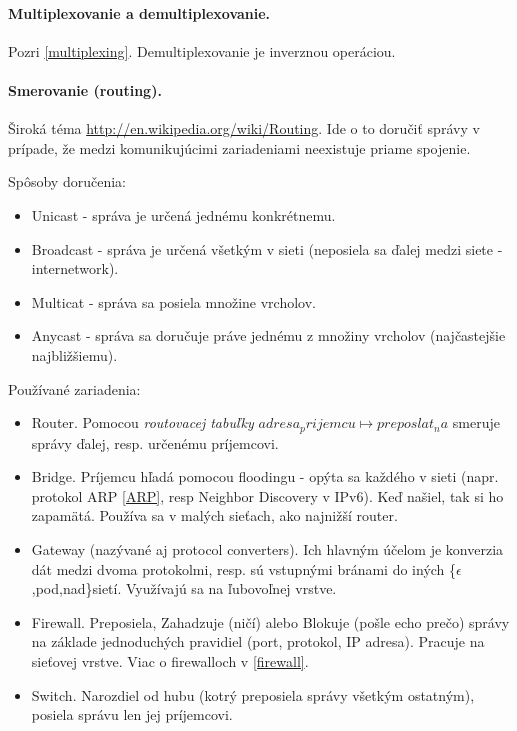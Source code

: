 \paragraph{Multiplexovanie a demultiplexovanie.}  
Pozri \ref{multiplexing}. Demultiplexovanie je inverznou operáciou. 

\paragraph{Smerovanie (routing).}     
Široká téma \url{http://en.wikipedia.org/wiki/Routing}. 
Ide o to doručiť správy v prípade, že medzi komunikujúcimi zariadeniami neexistuje priame spojenie. 

Spôsoby doručenia:
\begin{itemize}
\item Unicast - správa je určená jednému konkrétnemu.         
\item Broadcast - správa je určená všetkým v sieti (neposiela sa ďalej medzi siete - internetwork).
\item Multicat - správa sa posiela množine vrcholov. 
\item Anycast - správa sa doručuje práve jednému z množiny vrcholov (najčastejšie najbližšiemu).
\end{itemize}                               
                
Používané zariadenia:
\begin{itemize}
\item Router. Pomocou \emph{routovacej tabuľky} $adresa_prijemcu \mapsto preposlat_na$ smeruje správy ďalej, resp. určenému príjemcovi.         
\item Bridge. Príjemcu hľadá pomocou floodingu - opýta sa každého v sieti (napr. protokol ARP \ref{ARP}, resp Neighbor Discovery v IPv6). Keď našiel, tak si ho zapamätá. Používa sa v malých sieťach, ako najnižší router.  
\item Gateway (nazývané aj protocol converters). Ich hlavným účelom je konverzia dát medzi dvoma protokolmi, resp. sú vstupnými bránami do iných \{$\epsilon$,pod,nad\}sietí. Využívajú sa na ľubovoľnej vrstve. 
\item Firewall. Preposiela, Zahadzuje (ničí) alebo Blokuje (pošle echo prečo) správy na základe jednoduchých pravidiel (port, protokol, IP adresa). Pracuje na sieťovej vrstve. Viac o firewalloch v \ref{firewall}. 
\item Switch. Narozdiel od hubu (kotrý preposiela správy všetkým ostatným), posiela správu len jej príjemcovi. 
\end{itemize}  

